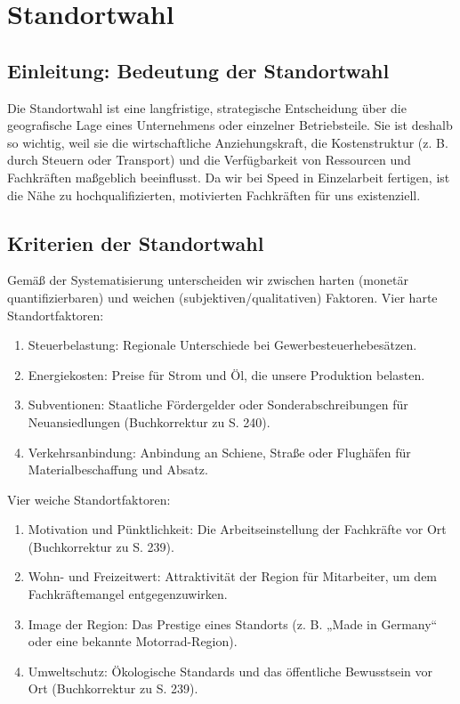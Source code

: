 \documentclass[12pt, a4paper]{article}
\begin{document}
\section{Standortwahl}
\subsection{Einleitung: Bedeutung der Standortwahl}
Die Standortwahl ist eine langfristige, strategische Entscheidung über die geografische 
Lage eines Unternehmens oder einzelner Betriebsteile. Sie ist deshalb so wichtig, 
weil sie die wirtschaftliche Anziehungskraft, die Kostenstruktur (z. B. durch Steuern oder Transport) 
und die Verfügbarkeit von Ressourcen und Fachkräften maßgeblich beeinflusst. Da wir bei 
Speed in Einzelarbeit fertigen, ist die Nähe zu hochqualifizierten, motivierten Fachkräften für uns existenziell.

\subsection{Kriterien der Standortwahl}
Gemäß der Systematisierung unterscheiden wir zwischen harten (monetär quantifizierbaren) und weichen (subjektiven/qualitativen) Faktoren.
Vier harte Standortfaktoren:
\begin{enumerate}
    \item Steuerbelastung: Regionale Unterschiede bei Gewerbesteuerhebesätzen.
    \item Energiekosten: Preise für Strom und Öl, die unsere Produktion belasten.
    \item Subventionen: Staatliche Fördergelder oder Sonderabschreibungen für Neuansiedlungen (Buchkorrektur zu S. 240).
    \item Verkehrsanbindung: Anbindung an Schiene, Straße oder Flughäfen für Materialbeschaffung und Absatz.
\end{enumerate}
    
Vier weiche Standortfaktoren:
\begin{enumerate}
    \item Motivation und Pünktlichkeit: Die Arbeitseinstellung der Fachkräfte vor Ort (Buchkorrektur zu S. 239).
    \item Wohn- und Freizeitwert: Attraktivität der Region für Mitarbeiter, um dem Fachkräftemangel entgegenzuwirken.
    \item Image der Region: Das Prestige eines Standorts (z. B. „Made in Germany“ oder eine bekannte Motorrad-Region).
    \item Umweltschutz: Ökologische Standards und das öffentliche Bewusstsein vor Ort (Buchkorrektur zu S. 239).
\end{enumerate}
\end{document}
